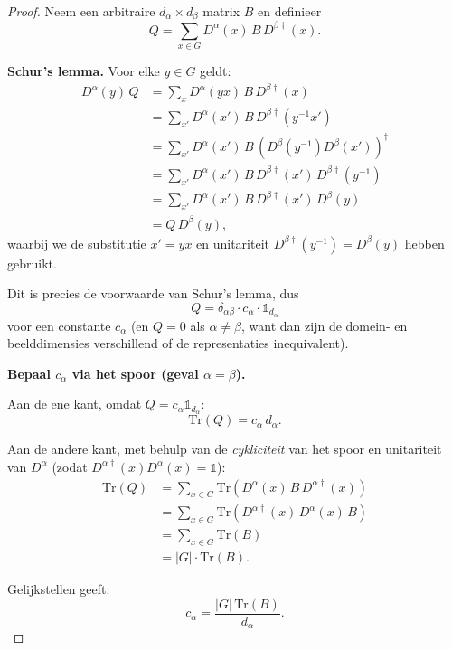 \begin{proof}
    Neem een arbitraire \(d_\alpha \times d_\beta\) matrix \(B\) en definieer
    \[
    Q = \sum_{x\in G} D^\alpha(x)\, B\, D^{\beta\dagger}(x).
    \]

    \textbf{Schur's lemma.}
    Voor elke \(y \in G\) geldt:
    \begin{align*}
        D^\alpha(y)\, Q
        &= \sum_x D^\alpha(yx)\, B\, D^{\beta\dagger}(x) \\
        &= \sum_{x'} D^\alpha(x')\, B\, D^{\beta\dagger}(y^{-1}x') \\
        &= \sum_{x'} D^\alpha(x')\, B\, \left(D^\beta(y^{-1})D^\beta(x')\right)^\dagger \\
        &= \sum_{x'} D^\alpha(x')\, B\, D^{\beta\dagger}(x')\, D^{\beta\dagger}(y^{-1}) \\
        &= \sum_{x'} D^\alpha(x')\, B\, D^{\beta\dagger}(x')\, D^{\beta}(y) \\
        &= Q\, D^\beta(y),
    \end{align*}
    waarbij we de substitutie \(x' = yx\) en unitariteit \(D^{\beta\dagger}(y^{-1}) = D^\beta(y)\) hebben gebruikt.

    Dit is precies de voorwaarde van Schur's lemma, dus
    \[
    Q = \delta_{\alpha\beta} \cdot c_\alpha \cdot \mathds{1}_{d_\alpha}
    \]
    voor een constante \(c_\alpha\) (en \(Q=0\) als \(\alpha \neq \beta\), want dan zijn de domein- en beelddimensies verschillend of de representaties inequivalent).

    \medskip
    \textbf{Bepaal \(c_\alpha\) via het spoor (geval \(\alpha = \beta\)).}

    Aan de ene kant, omdat \(Q = c_\alpha \mathds{1}_{d_\alpha}\):
    \[
    \text{Tr}(Q) = c_\alpha\, d_\alpha.
    \]

    Aan de andere kant, met behulp van de \emph{cykliciteit} van het spoor en unitariteit van \(D^\alpha\) (zodat \(D^{\alpha\dagger}(x)D^\alpha(x) = \mathds{1}\)):
    \begin{align*}
        \text{Tr}(Q) 
        &= \sum_{x \in G} \text{Tr}\left(D^\alpha(x)\, B\, D^{\alpha\dagger}(x)\right) \\
        &= \sum_{x \in G} \text{Tr}\left(D^{\alpha\dagger}(x)\, D^\alpha(x)\, B\right) \\
        &= \sum_{x \in G} \text{Tr}(B) \\
        &= |G| \cdot \text{Tr}(B).
    \end{align*}

    Gelijkstellen geeft:
    \[
    c_\alpha = \frac{|G|\, \text{Tr}(B)}{d_\alpha}.
    \]


\end{proof}
